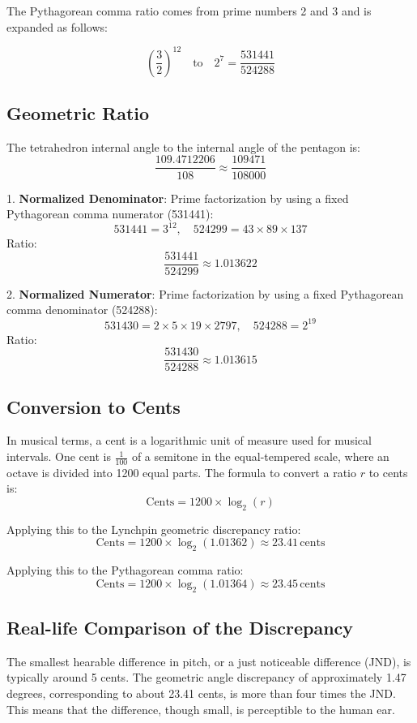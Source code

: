 \documentclass[a4paper,12pt]{article}
\begin{document}
The Pythagorean comma ratio comes from prime numbers 2 and 3 and is expanded as follows:

\[
\left(\frac{3}{2}\right)^{12} \quad \text{to} \quad 2^7 = \frac{531441}{524288}
\]

\subsection{Geometric Ratio}

The tetrahedron internal angle to the internal angle of the pentagon is:
\[
\frac{109.4712206}{108} \approx \frac{109471}{108000}
\]

1. \textbf{Normalized Denominator}: Prime factorization by using a fixed Pythagorean comma numerator (531441):
\[
531441 = 3^{12}, \quad 524299 = 43 \times 89 \times 137
\]
Ratio:
\[
\frac{531441}{524299} \approx 1.013622
\]

2. \textbf{Normalized Numerator}: Prime factorization by using a fixed Pythagorean comma denominator (524288):
\[
531430 = 2 \times 5 \times 19 \times 2797, \quad 524288 = 2^{19}
\]
Ratio:
\[
\frac{531430}{524288} \approx 1.013615
\]

\subsection{Conversion to Cents}

In musical terms, a cent is a logarithmic unit of measure used for musical intervals. One cent is \( \frac{1}{100} \) of a semitone in the equal-tempered scale, where an octave is divided into 1200 equal parts. The formula to convert a ratio \( r \) to cents is:
\[
\text{Cents} = 1200 \times \log_2(r)
\]

\noindent
Applying this to the Lynchpin geometric discrepancy ratio:
\[
\text{Cents} = 1200 \times \log_2(1.01362) \approx 23.41 \, \text{cents}
\]

\noindent
Applying this to the Pythagorean comma ratio:
\[
\text{Cents} = 1200 \times \log_2(1.01364) \approx 23.45 \, \text{cents}
\]


\subsection{Real-life Comparison of the Discrepancy}

The smallest hearable difference in pitch, or a just noticeable difference (JND), is typically around 5 cents. The geometric angle discrepancy of approximately 1.47 degrees, corresponding to about 23.41 cents, is more than four times the JND. This means that the difference, though small, is perceptible to the human ear.
\end{document}
